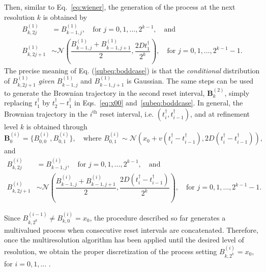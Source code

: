 \documentclass[preprint,12pt]{elsarticle}
\numberwithin{equation}{section}
\theoremstyle{plain} \newtheorem{theorem}{Theorem}[section]
\theoremstyle{plain} \newtheorem{proposition}[theorem]{Proposition}
\theoremstyle{plain} \newtheorem{lemma}[theorem]{Lemma}
\theoremstyle{plain} \newtheorem{corollary}[theorem]{Corollary}
\theoremstyle{definition} \newtheorem{definition}[theorem]{Definition}
\theoremstyle{definition} \newtheorem{notation}[theorem]{Notation}
\theoremstyle{remark} \newtheorem{remark}[theorem]{Remark}
\theoremstyle{remark} \newtheorem{remarks}[theorem]{Remarks}
\theoremstyle{remark} \newtheorem{algorithm2}[theorem]{Algorithm}
\theoremstyle{remark} \newtheorem{example}[theorem]{Example}
\begin{document}
Then, similar to Eq.~\eqref{eq:wiener}, the generation of the process at the next resolution $k$ is obtained by
\begin{subequations}
\label{eq:brown}
\begin{align}
        B^{(1)}_{k,2j} &= B^{(1)}_{k-1,j}, \quad \text{for } j = 0,1,\ldots, 2^{k-1},
        \quad \text{and}
        \label{subeq:bevencase} \\
        B^{(1)}_{k,2j+1} &\sim \mathcal{N}\left(\dfrac{B^{(1)}_{k-1,j}+B^{(1)}_{k-1,j+1}}{2}, \dfrac{2Dt^\dag_1}{2^{k}} \right),  \quad \text{for } j = 0,1, \ldots, 2^{k-1}-1. \label{subeq:boddcase}
\end{align}
\end{subequations}
The precise meaning of Eq. (\ref{subeq:boddcase})
is that the {\it conditional} distribution of $B^{(1)}_{k,2j+1}$
{\it given} $B^{(1)}_{k-1,j}$ and $B^{(1)}_{k-1,j+1}$
is Gaussian.
The same steps can be used to generate the Brownian trajectory in the second reset interval, $\mathbf{B}_k^{(2)}$, simply replacing $t_1^\dag$ by $t_2^\dag-t_1^\dag$ in Eqs.~\eqref{eq:x00} and~\eqref{subeq:boddcase}. In general, the Brownian trajectory in the $i^\text{th}$  reset interval, i.e. $(t^\dag_i,t^\dag_{i-1})$, and at refinement level $k$ is obtained through
\begin{equation}
\mathbf{B}_0^{(i)} = \{B^{(i)}_{0,0} , B^{(i)}_{0,1}\}, \quad \text{where } B^{(i)}_{0,1} \sim \mathcal{N}(x_0+v (t_i^\dag-t_{i-1}^\dag),2D(t_i^\dag-t_{i-1}^\dag)),
\label{eq:x00_V2}
\end{equation}
and
\begin{subequations}
\label{eq:brown_V2}
\begin{align}
        B^{(i)}_{k,2j} &= B^{(i)}_{k-1,j}, \quad \text{for } j = 0,1,\ldots, 2^{k-1},
        \quad \text{and}
        \\
        B^{(i)}_{k,2j+1} &\sim \mathcal{N}\left(\dfrac{B^{(i)}_{k-1,j}+B^{(i)}_{k-1,j+1}}{2}, \dfrac{2D(t_i^\dag-t_{i-1}^\dag)}{2^{k}} \right),  \quad \text{for } j = 0,1, \ldots, 2^{k-1}-1. \label{subeq:boddcase_V2}
\end{align}
\end{subequations}


Since $B^{(i-1)}_{k,2^{k}}\ne B^{(i)}_{k,0}=x_0$, the procedure described so far generates a multivalued process when consecutive reset intervals are concatenated. Therefore, once the multiresolution algorithm has been applied until the desired level of resolution, we obtain the proper discretization of the process setting  $B^{(i)}_{k,2^{k}}=x_0$, for $i=0,1,\ldots$ .
\end{document}
